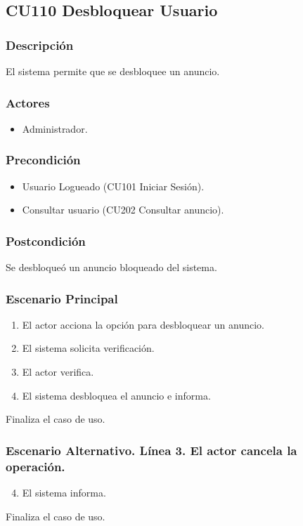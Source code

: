 \subsection{CU110 Desbloquear Usuario}
\subsubsection{Descripci\'{o}n}
El sistema permite que se desbloquee un anuncio.
\subsubsection{Actores}
\begin{itemize}
\item Administrador.
\end{itemize}
\subsubsection{Precondici\'{o}n}
\begin{itemize}
\item Usuario Logueado (CU101 Iniciar Sesi\'{o}n).
\item Consultar usuario (CU202 Consultar anuncio).
\end{itemize}
\subsubsection{Postcondici\'{o}n}
Se desbloque\'{o} un anuncio bloqueado del sistema.
\subsubsection{Escenario Principal}
\begin{enumerate}
\item El actor acciona la opci\'{o}n para desbloquear un anuncio.
\item El sistema solicita verificaci\'{o}n.
\item El actor verifica.
\item El sistema desbloquea el anuncio e informa.
\end{enumerate}
Finaliza el caso de uso.
\subsubsection{Escenario Alternativo. L\'{i}nea 3. El actor cancela la operaci\'{o}n.}
\begin{enumerate}
\setcounter{enumi}{3}
\item El sistema informa.
\end{enumerate}
Finaliza el caso de uso.